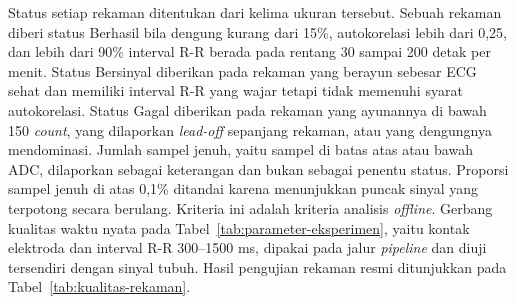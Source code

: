 Status setiap rekaman ditentukan dari kelima ukuran tersebut. Sebuah rekaman diberi status Berhasil bila dengung kurang dari 15\%, autokorelasi lebih dari 0,25, dan lebih dari 90\% interval R-R berada pada rentang 30 sampai 200 detak per menit. Status Bersinyal diberikan pada rekaman yang berayun sebesar ECG sehat dan memiliki interval R-R yang wajar tetapi tidak memenuhi syarat autokorelasi. Status Gagal diberikan pada rekaman yang ayunannya di bawah 150 \textit{count}, yang dilaporkan \textit{lead-off} sepanjang rekaman, atau yang dengungnya mendominasi. Jumlah sampel jenuh, yaitu sampel di batas atas atau bawah ADC, dilaporkan sebagai keterangan dan bukan sebagai penentu status. Proporsi sampel jenuh di atas 0,1\% ditandai karena menunjukkan puncak sinyal yang terpotong secara berulang. Kriteria ini adalah kriteria analisis \textit{offline}. Gerbang kualitas waktu nyata pada Tabel~\ref{tab:parameter-eksperimen}, yaitu kontak elektroda dan interval R-R 300--1500 ms, dipakai pada jalur \textit{pipeline} dan diuji tersendiri dengan sinyal tubuh. Hasil pengujian rekaman resmi ditunjukkan pada Tabel~\ref{tab:kualitas-rekaman}.

